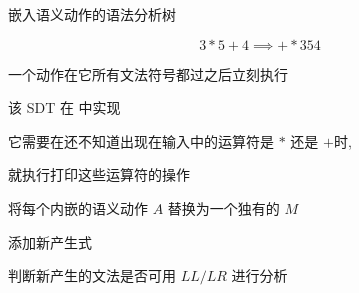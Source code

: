 \begin{frame}{}
  \begin{center}
    嵌入语义动作的语法分析树

    \[
      3 \ast 5 + 4 \implies + \ast 3 5 4
    \]
  \end{center}
\end{frame}

\begin{frame}{}
  
\end{frame}

\begin{frame}{}
  \begin{center}
     一个动作在它所有文法符号都过之后立刻执行

    \pause
    \vspace{0.30cm}

    \vspace{0.60cm}
  \end{center}
\end{frame}

\begin{frame}{}
  \begin{center}
    该 SDT 在  中实现


    \pause
    \vspace{0.50cm}
    它需要在还不知道出现在输入中的运算符是 $\ast$ 还是 $+$时,

    \vspace{0.30cm}
    就执行打印这些运算符的操作
  \end{center}
\end{frame}

\begin{frame}{}
  \begin{center}

    \pause
    \vspace{1.20cm}
    将每个内嵌的语义动作 $A$ 替换为一个独有的 $M$

    \vspace{0.60cm}
    添加新产生式 

    \vspace{0.60cm}
    判断新产生的文法是否可用 $LL/LR$ 进行分析
  \end{center}
\end{frame}

